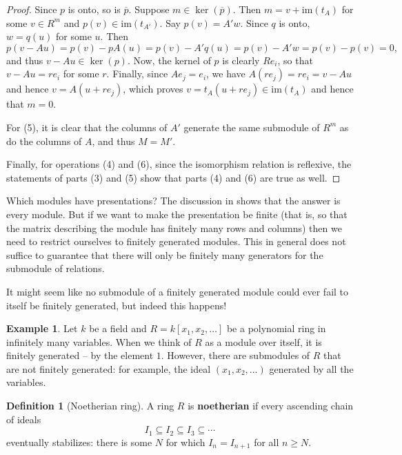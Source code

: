 \documentclass[12pt]{report}
\numberwithin{equation}{section}
\numberwithin{theorem}{chapter}
\theoremstyle{definition}
\newtheorem{definition}[theorem]{Definition}
\newtheorem{example}[theorem]{Example}
\newtheorem*{basic properties}{Basic Properties}
\newtheorem*{Important Remark}{Important Remark}
\renewcommand{\ker}{\operatorname{ker}}
\begin{document}
\begin{proof}
Since $p$ is onto, so is $\overline{p}$. Suppose $m \in \ker(\overline{p})$. Then $m = v + \mathrm{im}(t_A)$ for some $v \in R^m$ and $p(v) \in \mathrm{im}(t_{A'})$. Say $p(v) = A' w$. Since $q$ is onto, $w = q(u)$ for some $u$. Then
$$p(v - Au) = p(v) - pA(u) = p(v) - A'q(u) = p(v) - A'w = p(v) - p(v) = 0,$$
and thus $v - Au \in \ker(p)$. Now, the kernel of $p$ is
clearly $Re_i$, so that $v - Au = re_i$ for some $r$. Finally, since $Ae_j = e_i$, we have $A(re_j) = re_i = v - Au$ and hence $v = A(u + re_j)$, which proves
$v=t_A(u+re_j) \in \mathrm{im}(t_A)$ and hence that  $m = 0$.

For (5), it is clear that the columns of $A'$ generate the same submodule of $R^m$ as do the columns of $A$, and thus $M = M'$.
  
Finally, for operations (4) and (6), since the isomorphism relation is reflexive, the statements of parts (3) and (5) show that parts (4) and (6) are true as well.
\end{proof}

 
Which modules have presentations? The discussion in  shows that the answer is every module. But if we want to make the presentation be finite (that is, so that the matrix describing the module has finitely many rows and columns) then we need to restrict ourselves to finitely generated modules. This in general does not suffice to guarantee that there will only be finitely many generators for the submodule of relations.

It might seem like no submodule of a finitely generated module could ever fail to itself be finitely generated, but indeed this happens! %

\begin{example}
	Let $k$ be a field and $R = k[x_1, x_2, \ldots]$ be a polynomial ring in infinitely many variables. When we think of $R$ as a module over itself, it is finitely generated -- by the element $1$. However, there are submodules of $R$ that are not finitely generated: for example, the ideal $(x_1, x_2, \ldots)$ generated by all the variables.
\end{example}




\begin{definition}[Noetherian ring] 
	A ring $R$ is {\bf noetherian} if every ascending chain of ideals 
	$$I_1 \subseteq I_2 \subseteq I_3 \subseteq \cdots$$
	eventually stabilizes: there is some $N$ for which $I_n=I_{n+1}$ for all $n \geqslant N$.
\end{definition}
\end{document}
